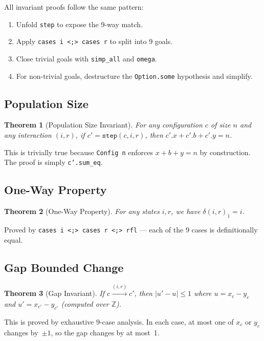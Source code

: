 \documentclass[11pt,a4paper]{article}
\newtheorem{theorem}{Theorem}[section]
\begin{document}
All invariant proofs follow the same pattern:
\begin{enumerate}[nosep]
  \item Unfold \texttt{step} to expose the 9-way match.
  \item Apply \texttt{cases i <;> cases r} to split into 9 goals.
  \item Close trivial goals with \texttt{simp\_all} and \texttt{omega}.
  \item For non-trivial goals, destructure the \texttt{Option.some}
        hypothesis and simplify.
\end{enumerate}

\subsection{Population Size}
\label{sec:popsize}

\begin{theorem}[Population Size Invariant]
\label{thm:popsize}
For any configuration $c$ of size $n$ and any interaction $(i,r)$, if
$c' = \texttt{step}(c, i, r)$, then $c'.x + c'.b + c'.y = n$.
\end{theorem}

This is trivially true because \texttt{Config n} enforces
$x + b + y = n$ by construction.  The proof is simply \texttt{c'.sum\_eq}.

\subsection{One-Way Property}

\begin{theorem}[One-Way Property]
For any states $i, r$, we have $\delta(i,r)_1 = i$.
\end{theorem}

Proved by \texttt{cases i <;> cases r <;> rfl} --- each of the 9 cases
is definitionally equal.

\subsection{Gap Bounded Change}

\begin{theorem}[Gap Invariant]
\label{thm:gap}
If $c \xrightarrow{(i,r)} c'$, then $|u' - u| \leq 1$ where
$u = x_c - y_c$ and $u' = x_{c'} - y_{c'}$ (computed over $\mathbb{Z}$).
\end{theorem}

This is proved by exhaustive 9-case analysis. In each case, at most one
of $x_c$ or $y_c$ changes by~$\pm 1$, so the gap changes by at most~1.
\end{document}
